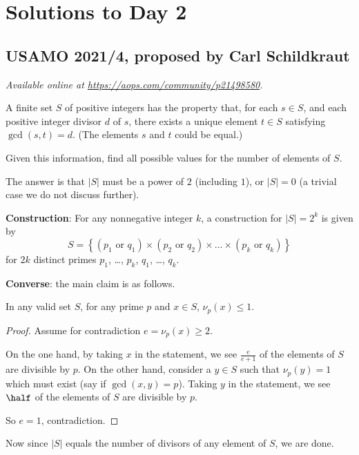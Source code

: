 \documentclass[11pt]{scrartcl}
\begin{document}
\section{Solutions to Day 2}
\subsection{USAMO 2021/4, proposed by Carl Schildkraut}
\textsl{Available online at \url{https://aops.com/community/p21498580}.}
\begin{mdframed}[style=mdpurplebox,frametitle={Problem statement}]
A finite set $S$ of positive integers has the property that,
for each $s\in S$, and each positive integer divisor $d$ of $s$,
there exists a unique element $t\in S$ satisfying $\gcd(s,t) = d$.
(The elements $s$ and $t$ could be equal.)

Given this information, find all possible values for the
number of elements of $S$.
\end{mdframed}
The answer is that $|S|$ must be a power of $2$ (including $1$),
or $|S| = 0$ (a trivial case we do not discuss further).

\medskip

\textbf{Construction}:
For any nonnegative integer $k$,
a construction for $|S| = 2^k$ is given
by
\[ S = \left\{
    (p_1 \text{ or } q_1)
    \times
    (p_2 \text{ or } q_2)
    \times
    \dots
    \times
    (p_k \text{ or } q_k)
  \right\}
\]
for $2k$ distinct primes $p_1$, \dots, $p_k$, $q_1$, \dots, $q_k$.

\medskip

\textbf{Converse}: the main claim is as follows.
\begin{claim*}
  In any valid set $S$,
  for any prime $p$ and $x \in S$, $\nu_p(x) \le 1$.
\end{claim*}
\begin{proof}
  Assume for contradiction $e = \nu_p(x) \ge 2$.
  \begin{itemize}
    \ii On the one hand, by taking $x$ in the statement,
    we see $\frac{e}{e+1}$ of the elements of $S$ are divisible by $p$.
    \ii On the other hand, consider a $y \in S$ such that
    $\nu_p(y)=1$ which must exist (say if $\gcd(x,y) = p$).
    Taking $y$ in the statement,
    we see $\half$ of the elements of $S$ are divisible by $p$.
  \end{itemize}
  So $e=1$, contradiction.
\end{proof}
Now since $|S|$ equals the number of divisors of any element of $S$,
we are done.
\pagebreak
\end{document}
